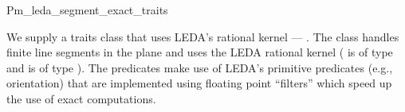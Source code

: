 
\ccRefPageBegin


\renewcommand{\ccRefPageBegin}{\begin{ccAdvanced}}
\renewcommand{\ccRefPageEnd}{\end{ccAdvanced}}

\begin{ccRefClass}{Pm_leda_segment_exact_traits}

We supply a traits class that uses LEDA's rational kernel ---
.
The class handles
finite line segments in the plane
and uses the LEDA rational kernel ( is of type 
 and  is of type
). The predicates make use of LEDA's primitive
predicates (e.g., orientation) that are implemented using floating point
``filters'' \cite{fv-sayee-96} which speed up the use of exact computations.


\ccIsModel

\end{ccRefClass} %

\renewcommand{\ccRefPageBegin}{}
\renewcommand{\ccRefPageEnd}{}

\ccRefPageEnd
